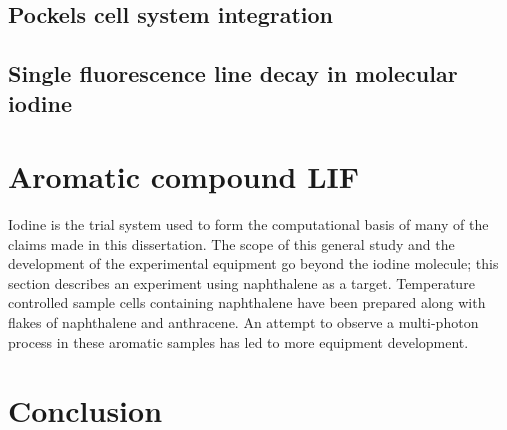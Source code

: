 \subsection{Pockels cell system integration}


\subsection{Single fluorescence line decay in molecular iodine}




\section{Aromatic compound LIF}
Iodine is the trial system used to form the computational basis of many of the claims made in this dissertation. The scope of this general study and the development of the experimental equipment go beyond the iodine molecule; this section describes an experiment using naphthalene as a target. Temperature controlled sample cells containing naphthalene have been prepared along with flakes of naphthalene and anthracene. An attempt to observe a multi-photon process in these aromatic samples has led to more equipment development.


\section{Conclusion}

